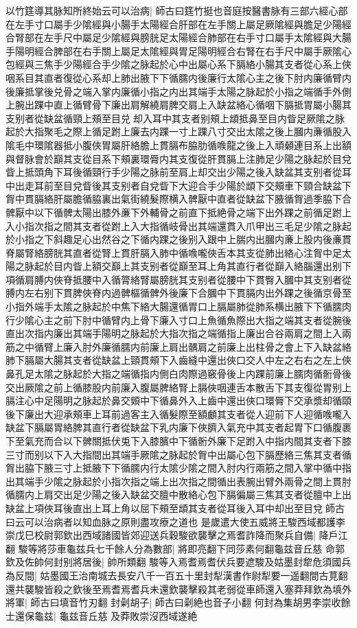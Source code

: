 以竹筳導其脉知所終始云可以治病|{
	師古曰筳竹挺也音庭按醫書脉有三部六經心部在左手寸口屬手少隂經與小腸手太陽經合肝部在左手關上屬足厥隂經與膽足少陽經合腎部在左手尺中屬足少隂經與膀胱足太陽經合肺部在右手寸口屬手太隂經與大腸手陽明經合脾部在右手關上屬足太隂經與胃足陽明經合右腎在右手尺中屬手厥隂心包經與三焦手少陽經合手少隂之脉起於心中出屬心系下膈絡小腸其支者從心系上俠咽系目其直者復從心系却上肺出腋下下循臑内後廉行太隂心主之後下肘内廉循臂内後廉抵掌後兑骨之端入掌内廉循小指之内出其端手太陽之脉起於小指之端循手外側上腕出踝中直上循臂骨下廉出肩解繞肩脾交肩上入缺盆絡心循咽下膈抵胃屬小腸其支别者從缺盆循頸上頰至目兑却入耳中其支者别頰上䪼抵鼻至目内眥足厥隂之脉起於大指聚毛之際上循足跗上廉去内踝一寸上踝八寸交出太隂之後上膕内亷循股入隂毛中環隂器抵小腹俠胃屬肝絡膽上貫膈布脇肋循㗋龍之後上入頑顙連目系上出額與督脉會於巔其支從目系下頰裏環脣内其支復從肝貫膈上注肺足少陽之脉起於目兌眥上抵頭角下耳後循頸行手少陽之脉前至肩上却交出少陽之後入缺盆其支别者從耳中出走耳前至目兌眥後其支别者自兌眥下大迎合手少陽於䪼下交頰車下頸合缺盆下胷中貫膈絡肝屬膽循脇裏出氣街繞髮際横入髀厭中直者從缺盆下腋循胷過季脇下合髀厭中以下循髀太陽出膝外亷下外輔骨之前直下抵絶骨之端下出外踝之前循足跗上入小指次指之間其支者從跗上入大指循岐骨出其端還貫入爪甲出三毛足少隂之脉起於小指之下斜趣足心出然谷之下循内踝之後别入跟中上腨内出膕内亷上股内後亷貫脊屬腎絡膀胱其直者從腎上貫肝膈入肺中循㗋嚨俠舌本其支從肺出絡心注胷中足太陽之脉起於目内眥上額交巔上其支别者從巔至耳上角其直行者從巔入絡腦還出别下項循肩膊内俠脊抵腰中入循膂絡腎屬膀胱其支别者從腰中下貫臀入膕中其支别者從膊内左右别下貫脾俠脊内過髀樞循髀外後廉下合膕中下貫膈内出外踝之後循京骨至小指外端手太隂之脉起於中焦下絡大腸還循胃口上膈屬肺從肺系横出腋下下循臑肉行少隂心主之前下肘中循臂内上骨下廉入寸口上魚循魚際出大指之端其支者從腕後直出次指内廉出其端手陽明之脉起於大指次指之端循指上廉出合谷兩肩之間上入兩筋之中循臂上廉入肘外廉循臑内前廉上肩出髃肩之前廉上出柱骨之會上下入缺盆絡肺下膈屬大腸其支者從缺盆上頸貫頰下入齒縫中還出俠口交人中左之右右之左上俠鼻孔足太隂之脉起於大指之端循指内側白肉際過竅骨後上内踝前廉上臑肉循䯒骨後交出厥隂之前上循膝股内前廉入腹屬脾絡腎上膈俠咽連舌本散舌下其支復從胃别上膈注心中足陽明之脉起於鼻交頞中下循鼻外入上齒中還出俠口環脣下交承漿却循頤後下廉出大迎承頰車上耳前過客主入循髮際至額顱其支者從人迎前下人迎循㗋嚨入缺盆下膈屬胃絡脾其直行者從缺盆下乳内廉下俠臍入氣充中其支者起胃下口循腹裹下至氣充而合以下髀關抵伏兎下入膝臏中下循䯒外廉下足跗入中指内間其支者下膝三寸而别以下入大指間出其端手厥隂之脉起於胷中出屬心包下膈歷絡三焦其支者循胷出脇下腋三寸上抵腋下下循臑内行太隂少隂之間入肘内行兩筋之間入掌中循中指出其端手少隂之脉起於小指次指之端上出次指之間循出表腕出臂外兩骨之間上貫肘循臑内上肩交出足少陽之後入缺盆交膻中散絡心包下膈徧屬三焦其支者從膻中上出缺盆上項俠耳後直出上耳上角以屈下頰至䪼其支者從耳後入耳中却出至目兌師古曰云可以治病者以知血脉之原則盡攻療之道也}
是歲遣大使五威將王駿西域都護李崇戊巳校尉郭欽出西域諸國皆郊迎送兵穀駿欲襲擊之焉耆詐降而聚兵自備|{
	降戶江翻}
駿等將莎車龜兹兵七千餘人分為數部|{
	將即亮翻下同莎素何翻龜兹音丘慈}
命郭欽及佐帥何封别將居後|{
	帥所類翻}
駿等入焉耆焉耆伏兵要遮駿及姑墨封犂危須國兵為反間|{
	姑墨國王治南城去長安八千一百五十里封犁漢書作尉犁要一遥翻間古莧翻}
還共襲駿皆殺之欽後至焉耆焉耆兵未還欽襲擊殺其老弱從車師還入塞莽拜欽為填外將軍|{
	師古曰填音竹刃翻}
封劋胡子|{
	師古曰劋絶也音子小翻}
何封為集胡男李崇收餘士還保龜兹|{
	龜兹音丘慈}
及莽敗崇沒西域遂絶

